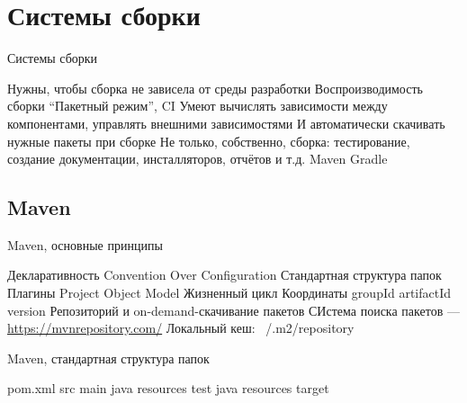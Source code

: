 \documentclass{../../slides-style}
\begin{document}
    \begin{frame}[plain]
        \titlepage
    \end{frame}

    \section{Системы сборки}

    \begin{frame}{Системы сборки}
        \begin{outline}
            \1 Нужны, чтобы сборка не зависела от среды разработки
                \2 Воспроизводимость сборки
                \2 \enquote{Пакетный режим}, CI
            \1 Умеют вычислять зависимости между компонентами, управлять внешними зависимостями
                \2 И автоматически скачивать нужные пакеты при сборке
            \1 Не только, собственно, сборка: тестирование, создание документации, инсталляторов, отчётов и т.д.
            \1 Maven
            \1 Gradle
        \end{outline}
    \end{frame}

    \subsection{Maven}

    \begin{frame}{Maven, основные принципы}
        \begin{outline}
            \1 Декларативность
            \1 Convention Over Configuration
                \2 Стандартная структура папок
            \1 Плагины
            \1 Project Object Model
            \1 Жизненный цикл
            \1 Координаты
                \2 groupId
                \2 artifactId
                \2 version
            \1 Репозиторий и on-demand-скачивание пакетов
                \2 СИстема поиска пакетов --- \url{https://mvnrepository.com/}
                \2 Локальный кеш: ~/.m2/repository
        \end{outline}
    \end{frame}

    \begin{frame}{Maven, стандартная структура папок}
        \begin{outline}
            \1 pom.xml
            \1 src
                \2 main
                    \3 java
                    \3 resources
                \2 test
                    \3 java
                    \3 resources
            \1 target
        \end{outline}
    \end{frame}
\end{document}
